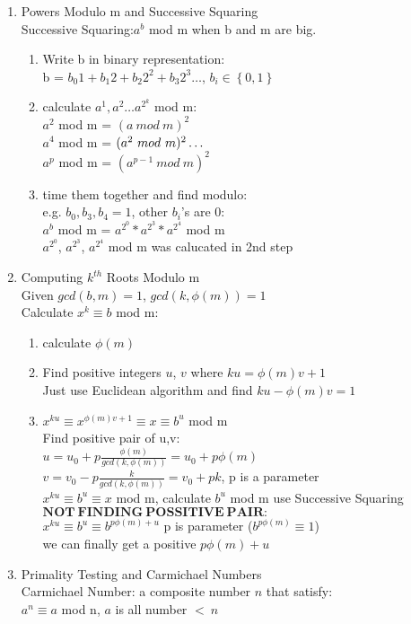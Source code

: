 \documentclass[10pt]{article}
\begin{document}
\begin{multicols}{2}
\begin{enumerate}
	\item Powers Modulo m and Successive Squaring \\
	Successive Squaring:$a^b$ mod m when b and m are big.\\
	\begin{enumerate}
		\item Write b in binary representation:\\
		b = $b_0 1+b_1 2 + b_2 2^2 + b_3 2^3 \dots $, $b_i\in\left\{ 0, 1 \right\}$
		\item calculate $a^1, a^2 \dots a^{2^k}$ mod m:\\
		$a^2$ mod m = $(a \ mod \ m)^2$\\
		$a^4$ mod m = $(a^2 \ mod \ m)^2 \\ \dots$\\
		$a^{p}$ mod m = $(a^{p-1} \ mod \ m)^2$
		\item time them together and find modulo:\\
		e.g. $b_0, b_3, b_4 = 1$, other $b_i$'s are 0:\\
		$a^b$ mod m = $a^{2^0} * a^{2^3} * a^{2^4}$ mod m\\
		$a^{2^0}$, $a^{2^3}$, $a^{2^4}$ mod m was calucated in 2nd step
	\end{enumerate}

	\item Computing $k^{th}$ Roots Modulo m\\
	Given $gcd(b,m) = 1$, $gcd(k,\phi(m)) = 1$\\
	Calculate $x^k \equiv b $ mod m:
	\begin{enumerate}
		\item calculate $\phi(m)$
		\item Find positive integers $u$, $v$ where $ku = \phi(m)v + 1$\\
		Just use Euclidean algorithm and find $ku - \phi(m)v = 1$
		\item $x^{ku} \equiv x^{\phi(m)v + 1} \equiv x \equiv b^u$ mod m\\
		Find positive pair of u,v:\\
		$u = u_0 + p\frac{\phi(m)}{gcd(k, \phi(m))} = u_0 + p\phi(m) $\\
		$v = v_0 - p\frac{k}{gcd(k, \phi(m))} = v_0 + pk $, p is a parameter\\
		$x^{ku} \equiv b^u \equiv x$ mod m, calculate $b^u$ mod m use Successive Squaring\\
		$\mathbf{NOT \ FINDING \ POSSITIVE \ PAIR:}$\\
		$x^{ku} \equiv b^u \equiv b^{p\phi(m) + u} $ p is parameter ($b^{p\phi(m)}\equiv 1$)\\
		we can finally get a positive $p\phi(m) + u$
	\end{enumerate} 

	\item Primality Testing and Carmichael Numbers\\
	Carmichael Number: a composite number $n$ that satisfy:\\
	$a^n \equiv a$ mod n, $a$ is all number $< \ n$
\end{enumerate}
\newpage
\end{multicols}
\end{document}

